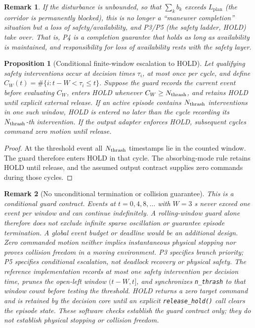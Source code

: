 \documentclass[11pt]{article}
\newtheorem{proposition}{Proposition}
\newtheorem{remark}{Remark}
\newcommand{\code}[1]{\texttt{#1}}
\begin{document}
\begin{remark}
If the disturbance is unbounded, so that $\sum_k b_k$ exceeds $L_{\text{plan}}$ (the corridor is permanently blocked), this is no longer a ``maneuver completion'' situation but a loss of safety/availability, and P3/P5 (the safety ladder, HOLD) take over. That is, P4 is a completion guarantee that holds as long as availability is maintained, and responsibility for loss of availability rests with the safety layer.
\end{remark}

\begin{proposition}[Conditional finite-window escalation to HOLD] \label{prop:p5}
Let qualifying safety interventions occur at decision times $\tau_i$, at most once per cycle, and define $C_W(t)=\#\{i:t-W<\tau_i\le t\}$. Suppose the guard records the current event before evaluating $C_W$, enters HOLD whenever $C_W\ge N_{\rm thrash}$, and retains HOLD until explicit external release. If an active episode contains $N_{\rm thrash}$ interventions in one such window, HOLD is entered no later than the cycle recording its $N_{\rm thrash}$-th intervention. If the output adapter enforces HOLD, subsequent cycles command zero motion until release.
\end{proposition}

\begin{proof}
At the threshold event all $N_{\rm thrash}$ timestamps lie in the counted window. The guard therefore enters HOLD in that cycle. The absorbing-mode rule retains HOLD until release, and the assumed output contract supplies zero commands during those cycles.
\end{proof}

\begin{remark}[No unconditional termination or collision guarantee]
This is a conditional guard contract. Events at $t=0,4,8,\ldots$ with $W=3$ s never exceed one event per window and can continue indefinitely. A rolling-window guard alone therefore does not exclude infinite sparse oscillation or guarantee episode termination. A global event budget or deadline would be an additional design. Zero commanded motion neither implies instantaneous physical stopping nor proves collision freedom in a moving environment. P3 specifies branch priority; P5 specifies conditional escalation, not deadlock recovery or physical safety.
The reference implementation records at most one safety intervention per decision time, prunes the open-left window $(t-W,t]$, and synchronizes \code{n\_thrash} to that window count before testing the threshold. HOLD returns a zero target command and is retained by the decision core until an explicit \code{release\_hold()} call clears the episode state. These software checks establish the guard contract only; they do not establish physical stopping or collision freedom.
\end{remark}
\end{document}

